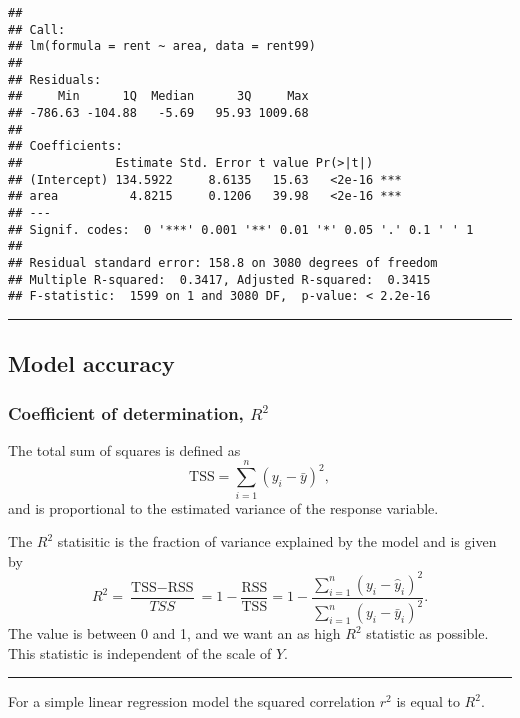 \documentclass[]{article}
\begin{document}
\footnotesize

\begin{verbatim}
## 
## Call:
## lm(formula = rent ~ area, data = rent99)
## 
## Residuals:
##     Min      1Q  Median      3Q     Max 
## -786.63 -104.88   -5.69   95.93 1009.68 
## 
## Coefficients:
##             Estimate Std. Error t value Pr(>|t|)    
## (Intercept) 134.5922     8.6135   15.63   <2e-16 ***
## area          4.8215     0.1206   39.98   <2e-16 ***
## ---
## Signif. codes:  0 '***' 0.001 '**' 0.01 '*' 0.05 '.' 0.1 ' ' 1
## 
## Residual standard error: 158.8 on 3080 degrees of freedom
## Multiple R-squared:  0.3417, Adjusted R-squared:  0.3415 
## F-statistic:  1599 on 1 and 3080 DF,  p-value: < 2.2e-16
\end{verbatim}

\normalsize

\begin{center}\rule{0.5\linewidth}{\linethickness}\end{center}

\hypertarget{model-accuracy}{%
\subsection{Model accuracy}\label{model-accuracy}}

\hypertarget{coefficient-of-determination-r2}{%
\subsubsection{\texorpdfstring{Coefficient of determination,
\(R^2\)}{Coefficient of determination, R\^{}2}}\label{coefficient-of-determination-r2}}

The total sum of squares is defined as
\[\text{TSS} = \sum_{i=1}^n (y_i - \bar{y})^2,\] and is proportional to
the estimated variance of the response variable.

The \(R^2\) statisitic is the fraction of variance explained by the
model and is given by
\[R^2 = \frac{\text{TSS}-\text{RSS}}{TSS}= 1-\frac{\text{RSS}}{\text{TSS}}=1-\frac{\sum_{i=1}^n(y_i-\hat{y}_i)^2}{\sum_{i=1}^n(y_i-\bar{y}_i)^2}.\]
The value is between 0 and 1, and we want an as high \(R^2\) statistic
as possible. This statistic is independent of the scale of \(Y\).

\begin{center}\rule{0.5\linewidth}{\linethickness}\end{center}

For a simple linear regression model the squared correlation \(r^2\) is
equal to \(R^2\).
\end{document}
